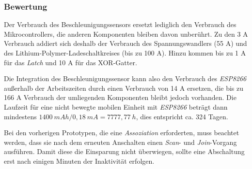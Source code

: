 \subsubsection{Bewertung}
Der Verbrauch des Beschleunigungssensors ersetzt lediglich den Verbrauch des Mikrocontrollers, die anderen Komponenten bleiben davon unberührt.
Zu den 3 \textmu A Verbrauch addiert sich deshalb der Verbrauch des Spannungswandlers (55 \textmu A) und des Lithium-Polymer-Ladeschaltkreises (bis zu 100 \textmu A).
Hinzu kommen bis zu 1 \textmu A für das \emph{Latch} und 10 \textmu A für das XOR-Gatter.

Die Integration des Beschleunigungssensor kann also den Verbrauch des \emph{ESP8266} außerhalb der Arbeitszeiten durch einen Verbrauch von 14 \textmu A ersetzen, die bis zu 166 \textmu A Verbrauch der umliegenden Komponenten bleibt jedoch vorhanden.
Die Laufzeit für eine nicht bewegte mobilen Einheit mit \emph{ESP8266} beträgt dann mindestens $1400\ mAh / 0,18\ mA = 7777,77\ h$, dies entspricht ca. 324 Tagen.

Bei den vorherigen Prototypen, die eine \emph{Assoziation} erforderten, muss beachtet werden, dass sie nach dem erneuten Anschalten einen \emph{Scan}- und \emph{Join}-Vorgang ausführen.
Damit diese die Einsparung nicht überwiegen, sollte eine Abschaltung erst nach einigen Minuten der Inaktivität erfolgen.


